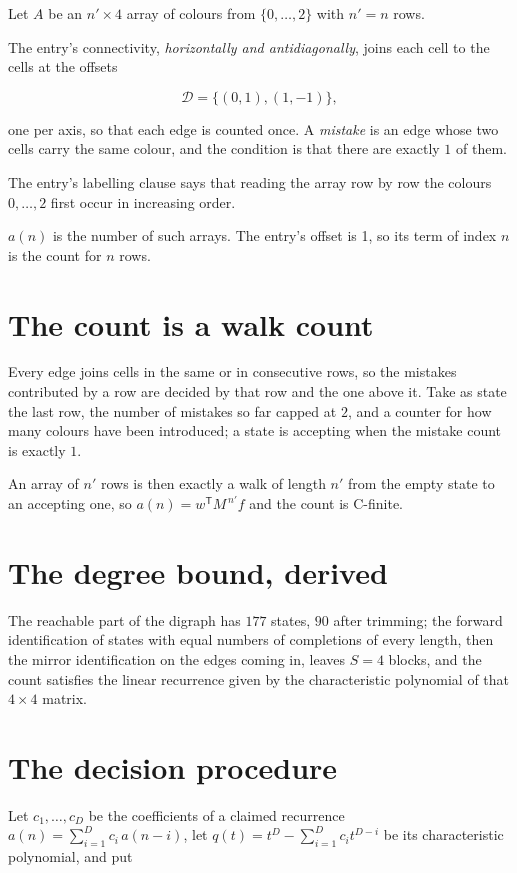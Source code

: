 \documentclass[11pt]{article}
\theoremstyle{definition}
\begin{document}
Let $A$ be an $n' \times 4$ array of colours from $\{0,\dots,2\}$ with $n' = n$ rows.

The entry's connectivity, {\itshape horizontally and antidiagonally}, joins each cell to the cells at the offsets

\[\mathcal{D} = \{(0,1), (1,-1)\},\]

one per axis, so that each edge is counted once. A {\itshape mistake} is an edge whose two cells carry the same colour, and the condition is that there are exactly $1$ of them.

The entry's labelling clause says that reading the array row by row the colours $0,\dots,2$ first occur in increasing order.

$a(n)$ is the number of such arrays. The entry's offset is 1, so its term of index $n$ is the count for $n$ rows.

\section{The count is a walk count}

Every edge joins cells in the same or in consecutive rows, so the mistakes contributed by a row are decided by that row and the one above it. Take as state the last row, the number of mistakes so far capped at $2$, and a counter for how many colours have been introduced; a state is accepting when the mistake count is exactly $1$.

An array of $n'$ rows is then exactly a walk of length $n'$ from the empty state to an accepting one, so $a(n) = w^{\mathsf T}M^{\,n'}f$ and the count is C-finite.

\section{The degree bound, derived}

The reachable part of the digraph has $177$ states, $90$ after trimming; the forward identification of states with equal numbers of completions of every length, then the mirror identification on the edges coming in, leaves $S = 4$ blocks, and the count satisfies the linear recurrence given by the characteristic polynomial of that $4\times4$ matrix.

\section{The decision procedure}

Let $c_1,\dots,c_D$ be the coefficients of a claimed recurrence $a(n) = \sum_{i=1}^{D} c_i\,a(n-i)$, let $q(t) = t^{D} - \sum_{i=1}^{D} c_i t^{D-i}$ be its characteristic polynomial, and put
\end{document}
